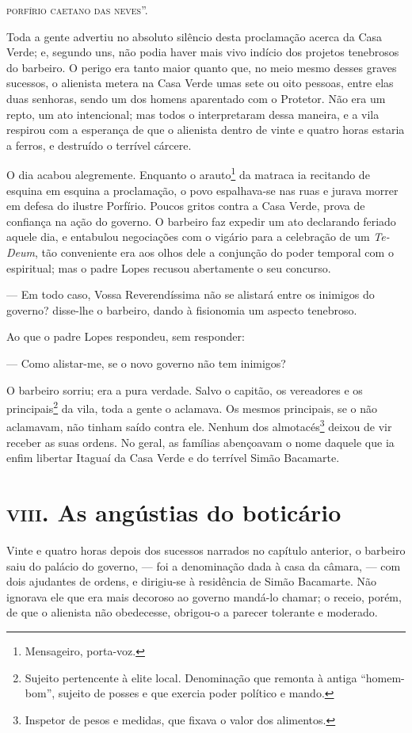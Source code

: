 \textsc{porfírio caetano das neves}''.

Toda a gente advertiu no absoluto silêncio desta proclamação acerca da
Casa Verde; e, segundo uns, não podia haver mais vivo indício dos
projetos tenebrosos do barbeiro. O perigo era tanto maior quanto que, no
meio mesmo desses graves sucessos, o alienista metera na Casa Verde umas
sete ou oito pessoas, entre elas duas senhoras, sendo um dos homens
aparentado com o Protetor. Não era um repto, um ato intencional; mas
todos o interpretaram dessa maneira, e a vila respirou com a esperança
de que o alienista dentro de vinte e quatro horas estaria a ferros, e
destruído o terrível cárcere.

O dia acabou alegremente. Enquanto o arauto\footnote{Mensageiro,
  porta-voz.} da matraca ia recitando de esquina em esquina a
proclamação, o povo espalhava-se nas ruas e jurava morrer em defesa do
ilustre Porfírio. Poucos gritos contra a Casa Verde, prova de confiança
na ação do governo. O barbeiro faz expedir um ato declarando feriado
aquele dia, e entabulou negociações com o vigário para a celebração de
um \emph{Te-Deum}, tão conveniente era aos olhos dele a conjunção do
poder temporal com o espiritual; mas o padre Lopes recusou abertamente o
seu concurso.

--- Em todo caso, Vossa Reverendíssima não se alistará entre os inimigos
do governo? disse-lhe o barbeiro, dando à fisionomia um aspecto
tenebroso.

Ao que o padre Lopes respondeu, sem responder:

--- Como alistar-me, se o novo governo não tem inimigos?

O barbeiro sorriu; era a pura verdade. Salvo o capitão, os vereadores e
os principais\footnote{Sujeito pertencente à elite local. Denominação
  que remonta à antiga ``homem-bom'', sujeito de posses e que exercia
  poder político e mando.} da vila, toda a gente o aclamava. Os mesmos
principais, se o não aclamavam, não tinham saído contra ele. Nenhum dos
almotacés\footnote{Inspetor de pesos e medidas, que fixava o valor dos
  alimentos.} deixou de vir receber as suas ordens. No geral, as
famílias abençoavam o nome daquele que ia enfim libertar Itaguaí da Casa
Verde e do terrível Simão Bacamarte.

\chapter{\textsc{viii}. As angústias do boticário}

Vinte e quatro horas depois dos sucessos narrados no capítulo anterior,
o barbeiro saiu do palácio do governo, --- foi a denominação dada à casa
da câmara, --- com dois ajudantes de ordens, e dirigiu-se à residência
de Simão Bacamarte. Não ignorava ele que era mais decoroso ao governo
mandá-lo chamar; o receio, porém, de que o alienista não obedecesse,
obrigou-o a parecer tolerante e moderado.

